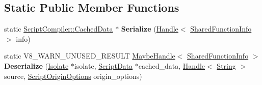 \subsection*{Static Public Member Functions}
\begin{DoxyCompactItemize}
\item 
\mbox{\label{classv8_1_1internal_1_1CodeSerializer_acb191010de0fcb2c05071d08d4a428cc}} 
static \mbox{\hyperlink{structv8_1_1ScriptCompiler_1_1CachedData}{Script\+Compiler\+::\+Cached\+Data}} $\ast$ {\bfseries Serialize} (\mbox{\hyperlink{classv8_1_1internal_1_1Handle}{Handle}}$<$ \mbox{\hyperlink{classv8_1_1internal_1_1SharedFunctionInfo}{Shared\+Function\+Info}} $>$ info)
\item 
\mbox{\label{classv8_1_1internal_1_1CodeSerializer_a1f048f4ae174e719ccefd2b3692cfa38}} 
static V8\+\_\+\+W\+A\+R\+N\+\_\+\+U\+N\+U\+S\+E\+D\+\_\+\+R\+E\+S\+U\+LT \mbox{\hyperlink{classv8_1_1internal_1_1MaybeHandle}{Maybe\+Handle}}$<$ \mbox{\hyperlink{classv8_1_1internal_1_1SharedFunctionInfo}{Shared\+Function\+Info}} $>$ {\bfseries Deserialize} (\mbox{\hyperlink{classv8_1_1internal_1_1Isolate}{Isolate}} $\ast$isolate, \mbox{\hyperlink{classv8_1_1internal_1_1ScriptData}{Script\+Data}} $\ast$cached\+\_\+data, \mbox{\hyperlink{classv8_1_1internal_1_1Handle}{Handle}}$<$ \mbox{\hyperlink{classv8_1_1internal_1_1String}{String}} $>$ source, \mbox{\hyperlink{classv8_1_1ScriptOriginOptions}{Script\+Origin\+Options}} origin\+\_\+options)
\end{DoxyCompactItemize}
